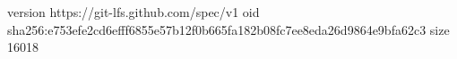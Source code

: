 version https://git-lfs.github.com/spec/v1
oid sha256:e753efe2cd6efff6855e57b12f0b665fa182b08fc7ee8eda26d9864e9bfa62c3
size 16018

